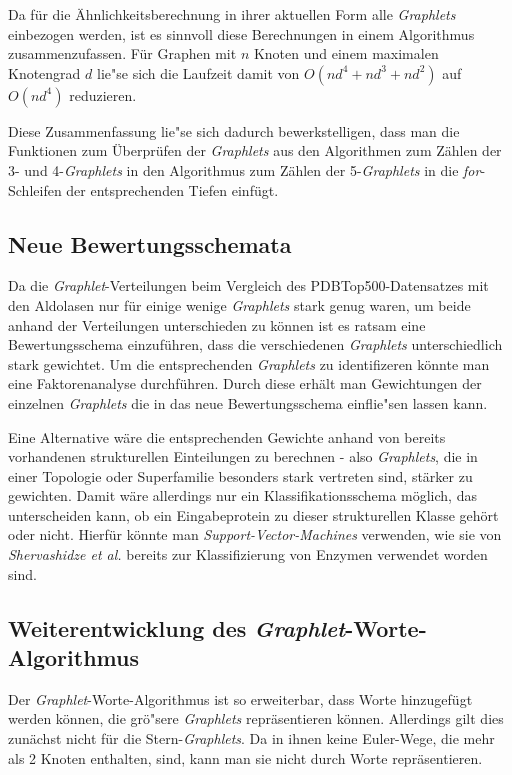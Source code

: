 \documentclass{report}
\begin{document}
Da f\"ur die \"Ahnlichkeitsberechnung in ihrer aktuellen Form alle \textit{Graphlets} einbezogen werden, ist es sinnvoll diese Berechnungen in einem Algorithmus zusammenzufassen. F\"ur Graphen mit $n$ Knoten und einem maximalen Knotengrad $d$ lie"se sich die Laufzeit damit von $O(nd^4+nd^3+nd^2)$ auf $O(nd^4)$ reduzieren.

Diese Zusammenfassung lie"se sich dadurch bewerkstelligen, dass man die Funktionen zum \"Uberpr\"ufen der \textit{Graphlets} aus den Algorithmen zum Z\"ahlen der 3- und 4-\textit{Graphlets} in den Algorithmus zum Z\"ahlen der 5-\textit{Graphlets} in die \textit{for}-Schleifen der entsprechenden Tiefen einf\"ugt.

\subsection{Neue Bewertungsschemata}

Da die \textit{Graphlet}-Verteilungen beim Vergleich des PDBTop500-Datensatzes mit den Aldolasen nur f\"ur einige wenige \textit{Graphlets} stark genug waren, um beide anhand der Verteilungen unterschieden zu k\"onnen ist es ratsam eine Bewertungsschema einzuf\"uhren, dass die verschiedenen \textit{Graphlets} unterschiedlich stark gewichtet. Um die entsprechenden \textit{Graphlets} zu identifizeren k\"onnte man eine Faktorenanalyse durchf\"uhren. Durch diese erh\"alt man Gewichtungen der einzelnen \textit{Graphlets} die in das neue Bewertungsschema einflie"sen lassen kann.

Eine Alternative w\"are die entsprechenden Gewichte anhand von bereits vorhandenen strukturellen Einteilungen zu berechnen - also \textit{Graphlets}, die in einer Topologie oder Superfamilie besonders stark vertreten sind, st\"arker zu gewichten. Damit w\"are allerdings nur ein Klassifikationsschema m\"oglich, das unterscheiden kann, ob ein Eingabeprotein zu dieser strukturellen Klasse geh\"ort oder nicht. Hierf\"ur k\"onnte man \textit{Support-Vector-Machines} verwenden, wie sie von \textit{Shervashidze et al.} \cite{sherv_graphlets} bereits zur Klassifizierung von Enzymen verwendet worden sind. 

\subsection{Weiterentwicklung des \textit{Graphlet}-Worte-Algorithmus}

Der \textit{Graphlet}-Worte-Algorithmus ist so erweiterbar, dass Worte hinzugef\"ugt werden k\"onnen, die gr\"o"sere \textit{Graphlets} repr\"asentieren k\"onnen. Allerdings gilt dies zun\"achst nicht f\"ur die Stern-\textit{Graphlets}. Da in ihnen keine Euler-Wege, die mehr als 2 Knoten enthalten, sind, kann man sie nicht durch Worte repr\"asentieren.
\end{document}
